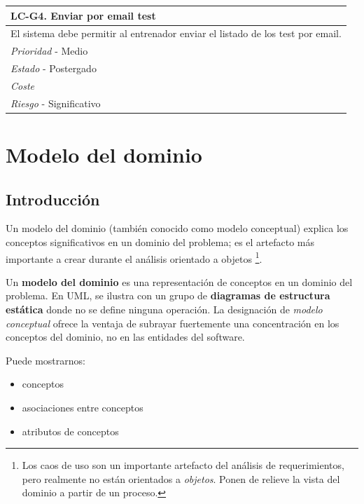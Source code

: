 	\begin{center}
		\begin{tabularx}{15cm}{|X|}
			\hline 
				\bf{LC-G4. Enviar por email test}\\
			\hline
				El sistema debe permitir al entrenador enviar el listado de los test por email.\\
			\hline
				{\it Prioridad} - Medio\\
			\hline
				{\it Estado} - Postergado\\
			\hline
				{\it Coste}\\
			\hline
				{\it Riesgo} - Significativo\\
			\hline
		\end{tabularx}
	\end{center}
	\bigskip %

\newpage %

%
%
\section{Modelo del dominio} %
	\label{sec:modelo_del_dominio}

%
%
\subsection{Introducción} %
	\label{sub:md_introduccion}
	
	Un modelo del dominio (también conocido como modelo conceptual) explica los conceptos significativos en un dominio del problema; es el artefacto más importante a crear durante el análisis orientado a objetos \footnote{Los caos de uso son un importante artefacto del análisis de requerimientos, pero realmente no están orientados a {\it objetos}. Ponen de relieve la vista del dominio a partir de un proceso.}. 
	
	Un {\bf modelo del dominio} es una representación de conceptos en un dominio del problema\cite{Fowler96}\cite{MO95}. En UML, se ilustra con un grupo de {\bf diagramas de estructura estática} donde no se define ninguna operación. La designación de {\it modelo conceptual} ofrece la ventaja de subrayar fuertemente una concentración en los conceptos del dominio, no en las entidades del software.
	
	Puede mostrarnos:
	\begin{itemize}
		\item{conceptos}
		\item{asociaciones entre conceptos}
		\item{atributos de conceptos}
	\end{itemize}
	
